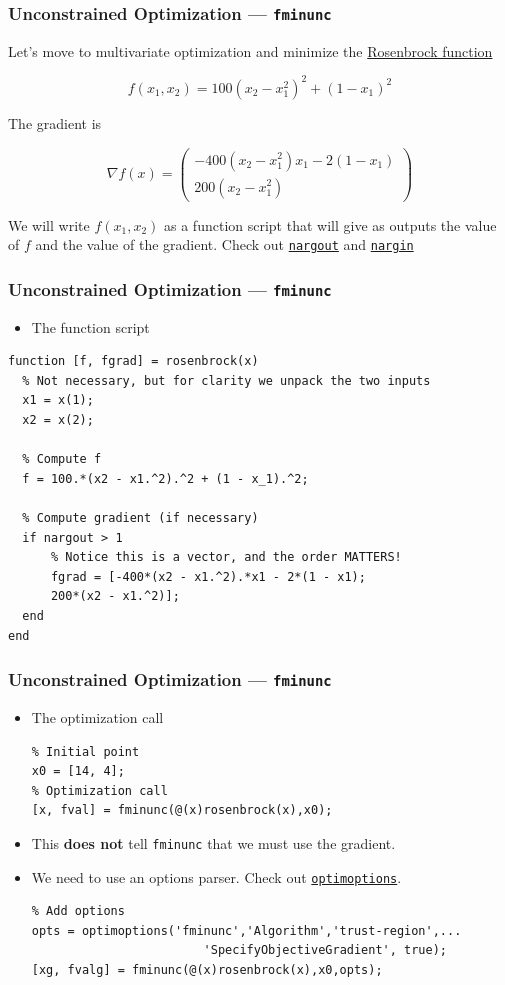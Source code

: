\documentclass[11pt,xcolor={svgnames},aspectratio=169,usepdftitle=false,notheorems]{beamer}
\begin{document}
\begin{frame}
  \frametitle{Unconstrained Optimization --- \texttt{fminunc}}
Let's move to multivariate optimization and minimize the \href{https://en.wikipedia.org/wiki/Rosenbrock_function}{Rosenbrock function}

\[
f(x_1,x_2) = 100 \left(x_2 - x^2_1\right)^2 + \left(1 - x_1\right)^2
\]

The gradient is

\[
\nabla f(x) = \begin{pmatrix}
  -400(x_2 - x_1^2)x_1 - 2(1 - x_1) \\
  200(x_2 - x^2_1)
\end{pmatrix}  
\]

We will write $f(x_1, x_2)$ as a function script that will give as outputs the value of $f$ and the value of the gradient. {\tiny Check out \href{https://www.mathworks.com/help/matlab/ref/nargout.html}{\texttt{nargout}} and \href{https://www.mathworks.com/help/matlab/ref/nargin.html}{\texttt{nargin}}}
\end{frame}

\begin{frame}[fragile]
  \frametitle{Unconstrained Optimization --- \texttt{fminunc}}
  \begin{itemize}
    \item The function script
  \end{itemize}
\begin{lstlisting}
function [f, fgrad] = rosenbrock(x)
  % Not necessary, but for clarity we unpack the two inputs
  x1 = x(1);
  x2 = x(2);

  % Compute f
  f = 100.*(x2 - x1.^2).^2 + (1 - x_1).^2;

  % Compute gradient (if necessary)
  if nargout > 1
      % Notice this is a vector, and the order MATTERS!
      fgrad = [-400*(x2 - x1.^2).*x1 - 2*(1 - x1);
      200*(x2 - x1.^2)];
  end
end
\end{lstlisting}
\end{frame}

\begin{frame}[fragile]
  \frametitle{Unconstrained Optimization --- \texttt{fminunc}}
  \begin{itemize}
    \item The optimization call
    \begin{lstlisting}
% Initial point
x0 = [14, 4];
% Optimization call
[x, fval] = fminunc(@(x)rosenbrock(x),x0);
    \end{lstlisting}
    \item This \alert{\textbf{does not}} tell \verb;fminunc; that we must use the gradient.
    \item We need to use an options parser. Check out \href{https://www.mathworks.com/help/optim/ug/optim.problemdef.optimizationproblem.optimoptions.html}{\texttt{optimoptions}}.
    \begin{lstlisting}
% Add options
opts = optimoptions('fminunc','Algorithm','trust-region',...
                        'SpecifyObjectiveGradient', true);
[xg, fvalg] = fminunc(@(x)rosenbrock(x),x0,opts);
    \end{lstlisting}
  \end{itemize}
\end{frame}
\end{document}

